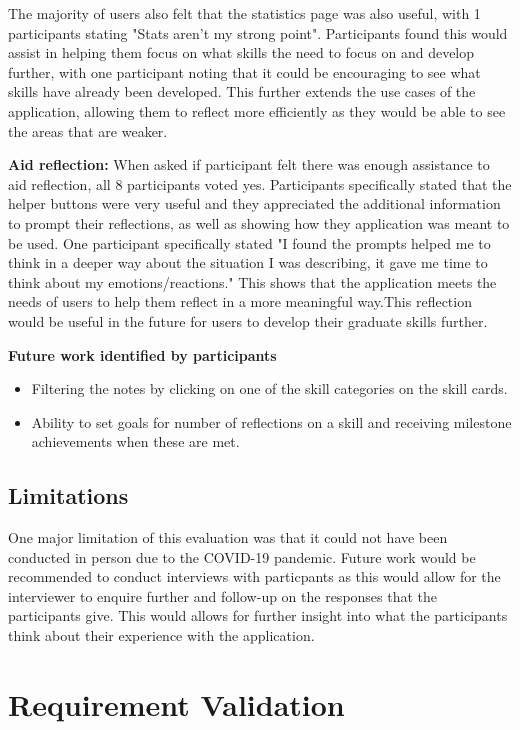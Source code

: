 \documentclass{l4proj}
\begin{document}
The majority of users also felt that the statistics page was also useful, with 1 participants stating "Stats aren't my strong point". Participants found this would assist in helping them focus on what skills the need to focus on and develop further, with one participant noting that it could be encouraging to see what skills have already been developed. This further extends the use cases of the application, allowing them to reflect more efficiently as they would be able to see the areas that are weaker. 

\textbf{Aid reflection:} When asked if participant felt there was enough assistance to aid reflection, all 8 participants voted yes. Participants specifically stated that the helper buttons were very useful and they appreciated the additional information to prompt their reflections, as well as showing how they application was meant to be used. One participant specifically stated "I found the prompts helped me to think in a deeper way about the situation I was describing, it gave me time to think about my emotions/reactions." This shows that the application meets the needs of users to help them reflect in a more meaningful way.This reflection would be useful in the future for users to develop their graduate skills further.


\textbf{Future work identified by participants}
\begin{itemize}
    \item Filtering the notes by clicking on one of the skill categories on the skill cards.
    \item Ability to set goals for number of reflections on a skill and receiving milestone achievements when these are met.
\end{itemize}

\subsection{Limitations}
One major limitation of this evaluation was that it could not have been conducted in person due to the COVID-19 pandemic. Future work would be recommended to conduct interviews with particpants as this would allow for the interviewer to enquire further and follow-up on the responses that the participants give. This would allows for further insight into what the participants think about their experience with the application.

\section{Requirement Validation}
\end{document}

